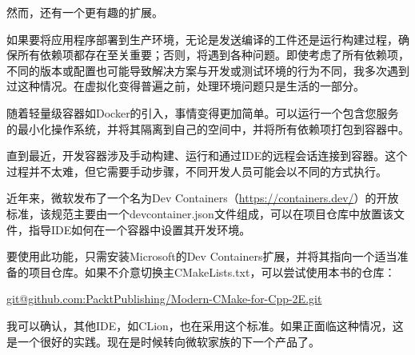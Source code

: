 然而，还有一个更有趣的扩展。


如果要将应用程序部署到生产环境，无论是发送编译的工件还是运行构建过程，确保所有依赖项都存在至关重要；否则，将遇到各种问题。即使考虑了所有依赖项，不同的版本或配置也可能导致解决方案与开发或测试环境的行为不同，我多次遇到过这种情况。在虚拟化变得普遍之前，处理环境问题只是生活的一部分。

随着轻量级容器如Docker的引入，事情变得更加简单。可以运行一个包含您服务的最小化操作系统，并将其隔离到自己的空间中，并将所有依赖项打包到容器中。

直到最近，开发容器涉及手动构建、运行和通过IDE的远程会话连接到容器。这个过程并不太难，但它需要手动步骤，不同开发人员可能会以不同的方式执行。

近年来，微软发布了一个名为Dev Containers（\url{https://containers.dev/}）的开放标准，该规范主要由一个devcontainer.json文件组成，可以在项目仓库中放置该文件，指导IDE如何在一个容器中设置其开发环境。

要使用此功能，只需安装Microsoft的Dev Containers扩展，并将其指向一个适当准备的项目仓库。如果不介意切换主CMakeLists.txt，可以尝试使用本书的仓库：

\url{git@github.com:PacktPublishing/Modern-CMake-for-Cpp-2E.git}

我可以确认，其他IDE，如CLion，也在采用这个标准。如果正面临这种情况，这是一个很好的实践。现在是时候转向微软家族的下一个产品了。



















